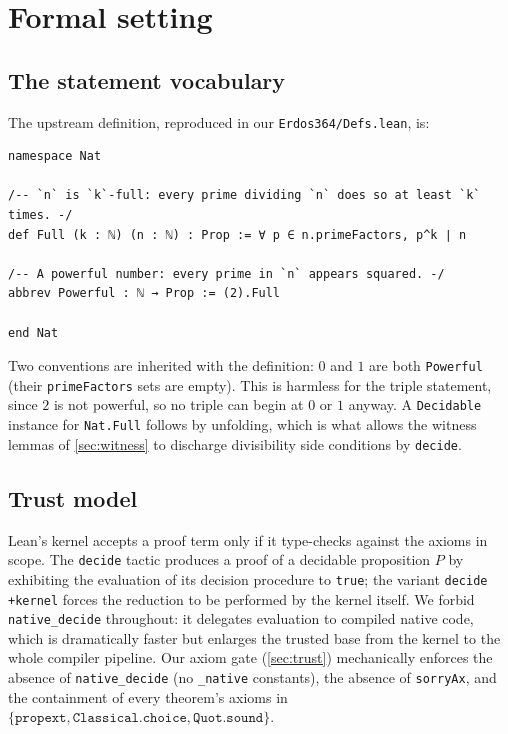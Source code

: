 \documentclass[11pt]{article}
\theoremstyle{definition}
\theoremstyle{remark}
\newcommand{\code}[1]{\texttt{#1}}
\newcommand{\Powerful}{\code{Powerful}}
\begin{document}
\section{Formal setting}\label{sec:setting}

\subsection{The statement vocabulary}

The upstream definition, reproduced in our \code{Erdos364/Defs.lean}, is:

\begin{lstlisting}
namespace Nat

/-- `n` is `k`-full: every prime dividing `n` does so at least `k` times. -/
def Full (k : ℕ) (n : ℕ) : Prop := ∀ p ∈ n.primeFactors, p^k ∣ n

/-- A powerful number: every prime in `n` appears squared. -/
abbrev Powerful : ℕ → Prop := (2).Full

end Nat
\end{lstlisting}

Two conventions are inherited with the definition: $0$ and $1$ are both
\Powerful{} (their \code{primeFactors} sets are empty). This is harmless
for the triple statement, since $2$ is not powerful, so no triple can
begin at $0$ or $1$ anyway. A \code{Decidable} instance for
\code{Nat.Full} follows by unfolding, which is what allows the witness
lemmas of \cref{sec:witness} to discharge divisibility side conditions by
\code{decide}.

\subsection{Trust model}

Lean's kernel accepts a proof term only if it type-checks against the
axioms in scope. The \code{decide} tactic produces a proof of a decidable
proposition $P$ by exhibiting the evaluation of its decision procedure to
\code{true}; the variant \code{decide +kernel} forces the reduction to be
performed by the kernel itself. We forbid \code{native\_decide}
throughout: it delegates evaluation to compiled native code, which is
dramatically faster but enlarges the trusted base from the kernel to the
whole compiler pipeline. Our axiom gate (\cref{sec:trust}) mechanically
enforces the absence of \code{native\_decide} (no \code{\_native}
constants), the absence of \code{sorryAx}, and the containment of every
theorem's axioms in $\{\code{propext}, \code{Classical.choice},
\code{Quot.sound}\}$.
\end{document}
